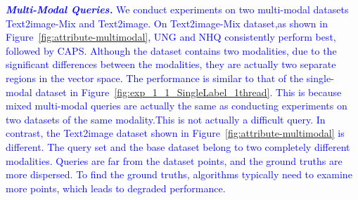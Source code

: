 \documentclass[sigconf, nonacm]{acmart}
\begin{document}
{%
	\textit{\textbf{\textcolor{blue}{Multi-Modal Queries.}}} \textcolor{blue}{
	We conduct experiments on two multi-modal  datasets Text2image-Mix and Text2image. 
On Text2image-Mix dataset,as shown in Figure~\ref{fig:attribute-multimodal}, UNG and NHQ consistently perform best, followed by CAPS.
Although the dataset contains two modalities, due to the significant differences between the modalities, they are actually two separate regions in the vector space. The performance is similar to that of the single-modal dataset in Figure~\ref{fig:exp_1_1_SingleLabel_1thread}. This is because mixed multi-modal queries are actually the same as conducting experiments on two datasets of the same modality.This is not actually a difficult query.
		In contrast, the Text2image dataset shown in Figure~\ref{fig:attribute-multimodal} is different. The query set and the base dataset belong to two completely different modalities. Queries are far from the dataset points, and the ground truths are more dispersed. To find the ground truths, algorithms typically need to examine more points, which leads to degraded performance.
}}
\end{document}
